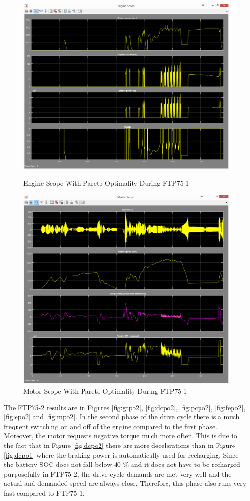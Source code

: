 \begin{figure}[hp]
\centering
\includegraphics[scale=0.47]{figures/Pareto/FTP75-1/engine30Juni}
\caption{Engine Scope With Pareto Optimality During FTP75-1}
\label{fig:epo1}
\includegraphics[scale=0.5]{figures/Pareto/FTP75-1/motor30Juni}
\caption{Motor Scope With Pareto Optimality During FTP75-1}
\label{fig:mpo1}
\end{figure}

The FTP75-2 results are in Figures \ref{fig:gtpo2}, \ref{fig:dcpo2}, \ref{fig:pcpo2}, \ref{fig:fepo2}, \ref{fig:epo2} and \ref{fig:mpo2}. In the second phase of the drive cycle there is a much frequent switching on and off of the engine compared to the first phase. Moreover, the motor requests negative torque much more often. This is due to the fact that in Figure \ref{fig:dcpo2} there are more decelerations than in Figure \ref{fig:dcpo1} where the braking power is automatically used for recharging. Since the battery SOC does not fall below 40 \% and it does not have to be recharged purposefully in FTP75-2, the drive cycle demands are met very well and the actual and demanded speed are always close. Therefore, this phase also runs very fast compared to FTP75-1.

